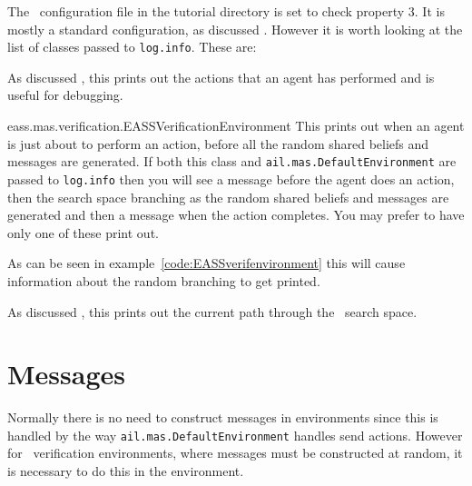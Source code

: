 The \jpf\ configuration file in the tutorial directory is set to check property 3.  It is mostly a standard configuration, as discussed .  However it is worth looking at the list of classes passed to \texttt{log.info}.  These are:
\begin{description}
\item[ail.mas.DefaultEnvironment] As discussed , this prints out the actions that an agent has performed and is useful for debugging.
\begin{sloppypar}
\item[eass.mas.verification.EASSVerificationEnvironment] This prints out when an agent is just about to perform an action, before all the random shared beliefs and messages are generated.  If both this class and \texttt{ail.mas.DefaultEnvironment} are passed to \texttt{log.info} then you will see a message before the agent does an action, then the search space branching as the random shared beliefs and messages are generated and then a message when the action completes.  You may prefer to have only one of these print out.
\end{sloppypar}
\item[eass.tutorials.tutorial3.VerificationEnvironment] As can be seen in example~\ref{code:EASSverifenvironment} this will cause information about the random branching to get printed.
\item[ajpf.product.Product] As discussed , this prints out the current path through the \ajpf\ search space.
\end{description}

\section{Messages}
Normally there is no need to construct messages in environments since this is handled by the way \texttt{ail.mas.DefaultEnvironment} handles send actions.  However for \eass\ verification environments, where messages must be constructed at random, it is necessary to do this in the environment.

